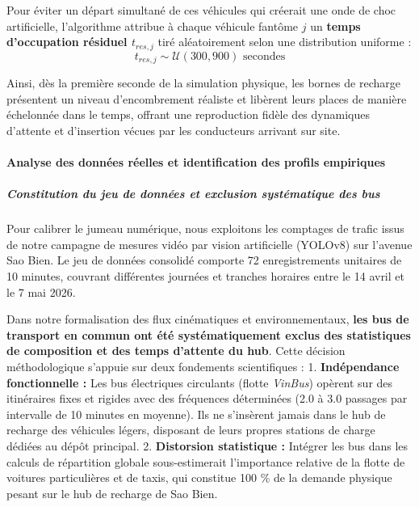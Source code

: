 \documentclass[10pt, a4paper]{article}
\begin{document}
Pour éviter un départ simultané de ces véhicules qui créerait une onde
de choc artificielle, l'algorithme attribue à chaque véhicule fantôme
\(j\) un \textbf{temps d'occupation résiduel \(t_{res, j}\)} tiré
aléatoirement selon une distribution uniforme :
\[t_{res, j} \sim \mathcal{U}(300, 900) \text{ secondes}\]

Ainsi, dès la première seconde de la simulation physique, les bornes de
recharge présentent un niveau d'encombrement réaliste et libèrent leurs
places de manière échelonnée dans le temps, offrant une reproduction
fidèle des dynamiques d'attente et d'insertion vécues par les
conducteurs arrivant sur site.

\paragraph{Analyse des données réelles et identification des profils
empiriques}\label{analyse-des-donnuxe9es-ruxe9elles-et-identification-des-profils-empiriques}

\subparagraph{Constitution du jeu de données et exclusion systématique
des
bus}\label{constitution-du-jeu-de-donnuxe9es-et-exclusion-systuxe9matique-des-bus}

Pour calibrer le jumeau numérique, nous exploitons les comptages de
trafic issus de notre campagne de mesures vidéo par vision artificielle
(YOLOv8) sur l'avenue Sao Bien. Le jeu de données consolidé comporte 72
enregistrements unitaires de 10 minutes, couvrant différentes journées
et tranches horaires entre le 14 avril et le 7 mai 2026.

Dans notre formalisation des flux cinématiques et environnementaux,
\textbf{les bus de transport en commun ont été systématiquement exclus
des statistiques de composition et des temps d'attente du hub}. Cette
décision méthodologique s'appuie sur deux fondements scientifiques : 1.
\textbf{Indépendance fonctionnelle :} Les bus électriques circulants
(flotte \emph{VinBus}) opèrent sur des itinéraires fixes et rigides avec
des fréquences déterminées (2.0 à 3.0 passages par intervalle de 10
minutes en moyenne). Ils ne s'insèrent jamais dans le hub de recharge
des véhicules légers, disposant de leurs propres stations de charge
dédiées au dépôt principal. 2. \textbf{Distorsion statistique :}
Intégrer les bus dans les calculs de répartition globale sous-estimerait
l'importance relative de la flotte de voitures particulières et de
taxis, qui constitue 100 \% de la demande physique pesant sur le hub de
recharge de Sao Bien.
\end{document}
